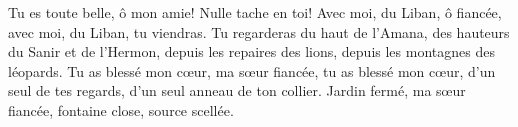 Tu es toute belle, ô mon amie! Nulle tache en toi!
	Avec moi, du Liban, ô fiancée, avec moi, du Liban, tu viendras.
Tu regarderas du haut de l’Amana, des hauteurs du Sanir et de l’Hermon,
	depuis les repaires des lions, depuis les montagnes des léopards.
Tu as blessé mon cœur, ma sœur fiancée,
	tu as blessé mon cœur, d’un seul de tes regards,
		d’un seul anneau de ton collier.
Jardin fermé, ma sœur fiancée, fontaine close, source scellée.
